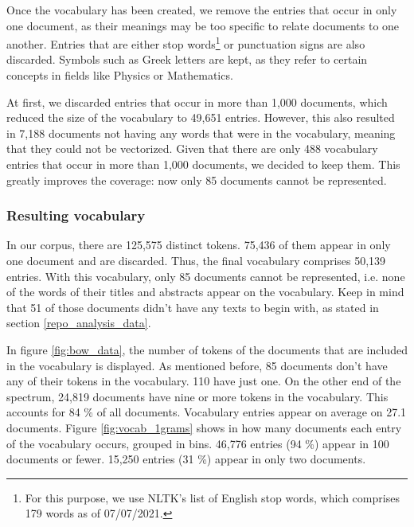 Once the vocabulary has been created, we remove the entries that occur in only one document, as their meanings may be too specific to relate documents to one another. Entries that are either stop words\footnote{For this purpose, we use NLTK's list of English stop words, which comprises 179 words as of 07/07/2021.} or punctuation signs are also discarded. Symbols such as Greek letters are kept, as they refer to certain concepts in fields like Physics or Mathematics.

At first, we discarded entries that occur in more than 1,000 documents, which reduced the size of the vocabulary to 49,651 entries. However, this also resulted in 7,188 documents not having any words that were in the vocabulary, meaning that they could not be vectorized. Given that there are only 488 vocabulary entries that occur in more than 1,000 documents, we decided to keep them. This greatly improves the coverage: now only 85 documents cannot be represented.

\subsubsection{Resulting vocabulary} \label{vocab_results}

In our corpus, there are 125,575 distinct tokens. 75,436 of them appear in only one document and are discarded. Thus, the final vocabulary comprises 50,139 entries. With this vocabulary, only 85 documents cannot be represented, i.e. none of the words of their titles and abstracts appear on the vocabulary. Keep in mind that 51 of those documents didn't have any texts to begin with, as stated in section \ref{repo_analysis_data}.

In figure \ref{fig:bow_data}, the number of tokens of the documents that are included in the vocabulary is displayed. As mentioned before, 85 documents don't have any of their tokens in the vocabulary. 110 have just one. On the other end of the spectrum, 24,819 documents have nine or more tokens in the vocabulary. This accounts for 84 \% of all documents. Vocabulary entries appear on average on 27.1 documents. Figure \ref{fig:vocab_1grams} shows in how many documents each entry of the vocabulary occurs, grouped in bins. 46,776 entries (94 \%) appear in 100 documents or fewer. 15,250 entries (31 \%) appear in only two documents.

